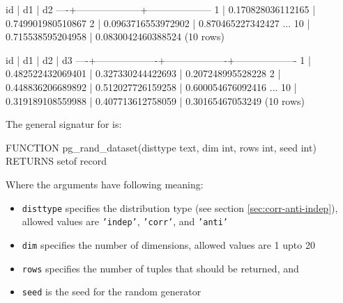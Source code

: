 \begin{interactive}
 id |         d1         |         d2
----+--------------------+--------------------
  1 |  0.170828036112165 |  0.749901980510867
  2 | 0.0963716553972902 |  0.870465227342427
...
 10 |  0.715538595204958 | 0.0830042460388524
(10 rows)

 id |        d1         |        d2         |        d3
----+-------------------+-------------------+-------------------
  1 | 0.482522432069401 | 0.327330244422693 | 0.207248995528228
  2 | 0.448836206689892 | 0.512027726159258 | 0.600054676092416
...
 10 | 0.319189108559988 | 0.407713612758059 |  0.30165467053249
(10 rows)

\end{interactive}

\noindent
The general signatur for  is:
\begin{interactive}
FUNCTION pg_rand_dataset(disttype text, dim int, rows int, seed int)
RETURNS setof record
\end{interactive}

\noindent
Where the arguments have following meaning:
\begin{itemize}
\item \texttt{disttype} specifies the distribution type (see section \ref{sec:corr-anti-indep}), allowed values are \texttt{'indep'}, \texttt{'corr'}, and \texttt{'anti'}

\item \texttt{dim} specifies the number of dimensions, allowed values are 1 upto 20 

\item \texttt{rows} specifies the number of tuples that should be returned, and 

\item \texttt{seed} is the seed for the random generator
\end{itemize}


